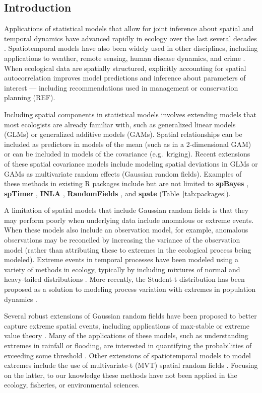 \documentclass[12pt,english]{article}
\begin{document}
\begin{spacing}{1.3}
\section{Introduction}

Applications of statistical models that allow for joint inference about spatial
and temporal dynamics have advanced rapidly in ecology over the last several
decades \citep[e.g.][]{bascompte1995, latimer2009}. Spatiotemporal models have
also been widely used in other disciplines, including applications to weather,
remote sensing, human disease dynamics, and crime \citep{cressie2011}. When
ecological data are spatially structured, explicitly accounting for spatial
autocorrelation improves model predictions and inference about parameters of
interest --- including recommendations used in management or conservation
planning (REF).

Including spatial components in statistical models involves extending models
that most ecologists are already familiar with, such as generalized linear
models (GLMs) or generalized additive models (GAMs). Spatial relationships can
be included as predictors in models of the mean (such as in a 2-dimensional
GAM) or can be included in models of the covariance (e.g.\ kriging). Recent
extensions of these spatial covariance models include modeling spatial
deviations in GLMs or GAMs as multivariate random effects (Gaussian random
fields). Examples of these methods in existing R packages include but are not
limited to \textbf{spBayes} \citep{finley2007}, \textbf{spTimer}
\citep{bakar2015}, \textbf{INLA} \citep{rue2009}, \textbf{RandomFields}
\citep{schlather2016}, and \textbf{spate} \citep{sigrist2015}
(Table~\ref{tab:packages}).

A limitation of spatial models that include Gaussian random fields is that they
may perform poorly when underlying data include anomalous or extreme events.
When these models also include an observation model, for example, anomalous
observations may be reconciled by increasing the variance of the observation
model (rather than attributing these to extremes in the ecological process
being modeled). Extreme events in temporal processes have been modeled using a
variety of methods in ecology, typically by including mixtures of normal and
heavy-tailed distributions \citep[e.g.][]{everitt1996, ward2007, thorson2011}.
More recently, the Student-t distribution has been proposed as a
solution to modeling process variation with extremes in population dynamics
\citep{anderson2017}.

Several robust extensions of Gaussian random fields have been proposed to
better capture extreme spatial events, including applications of max-stable or
extreme value theory \citep{davison2012, davison2012a}. Many of the
applications of these models, such as understanding extremes in rainfall or
flooding, are interested in quantifying the probabilities of exceeding some
threshold \citep{davis2008}. Other extensions of spatiotemporal models to
model extremes include the use of multivariate-t (MVT) spatial random fields
\citep{roislien2007}. Focusing on the latter, to our knowledge these methods
have not been applied in the ecology, fisheries, or environmental sciences.


\end{spacing}
\end{document}
